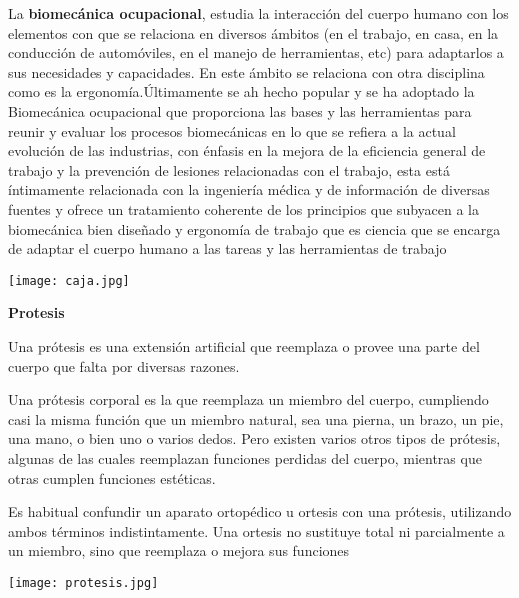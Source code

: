 \documentclass{article}
\begin{document}
La \textbf {biomecánica ocupacional}, estudia la interacción del cuerpo humano con los elementos con que se relaciona en diversos ámbitos (en el trabajo, en casa, en la conducción de automóviles, en el manejo de herramientas, etc) para adaptarlos a sus necesidades y capacidades. En este ámbito se relaciona con otra disciplina como es la ergonomía.Últimamente se ah hecho popular y se ha adoptado la Biomecánica ocupacional que proporciona las bases y las herramientas para reunir y evaluar los procesos biomecánicas en lo que se refiera a la actual evolución de las industrias, con énfasis en la mejora de la eficiencia general de trabajo y la prevención de lesiones relacionadas con el trabajo, esta está íntimamente relacionada con la ingeniería médica y de información de diversas fuentes y ofrece un tratamiento coherente de los principios que subyacen a la biomecánica bien diseñado y ergonomía de trabajo que es ciencia que se encarga de adaptar el cuerpo humano a las tareas y las herramientas de trabajo

\hspace{1cm} 

\begin{minipage}{.89\linewidth}
\centering
\texttt{[image: caja.jpg]}
\end{minipage}
\clearpage

\textbf{Protesis}



Una prótesis es una extensión artificial que reemplaza o provee una parte del cuerpo que falta por diversas razones.

Una prótesis corporal es la que reemplaza un miembro del cuerpo, cumpliendo casi la misma función que un miembro natural, sea una pierna, un brazo, un pie, una mano, o bien uno o varios dedos. Pero existen varios otros tipos de prótesis, algunas de las cuales reemplazan funciones perdidas del cuerpo, mientras que otras cumplen funciones estéticas.


Es habitual confundir un aparato ortopédico u ortesis con una prótesis, utilizando ambos términos indistintamente. Una ortesis no sustituye total ni parcialmente a un miembro, sino que reemplaza o mejora sus funciones


\hspace{1cm} 

\begin{minipage}{.89\linewidth}
\centering
\texttt{[image: protesis.jpg]}
\end{minipage}
\end{document}
